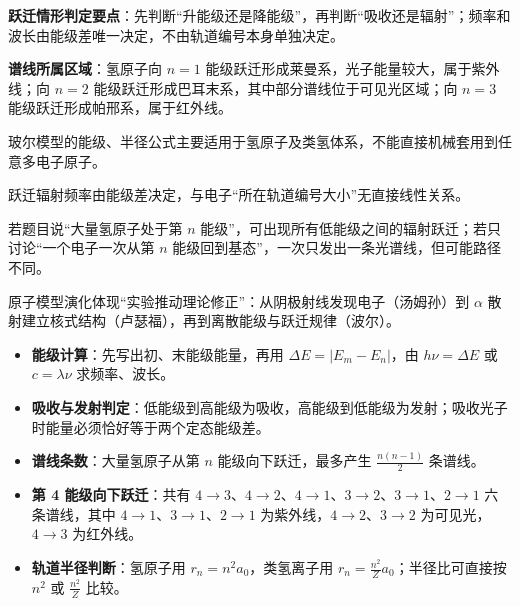 \textbf{跃迁情形判定要点}：先判断“升能级还是降能级”，再判断“吸收还是辐射”；频率和波长由能级差唯一决定，不由轨道编号本身单独决定。

\textbf{谱线所属区域}：氢原子向 $n=1$ 能级跃迁形成莱曼系，光子能量较大，属于紫外线；向 $n=2$ 能级跃迁形成巴耳末系，其中部分谱线位于可见光区域；向 $n=3$ 能级跃迁形成帕邢系，属于红外线。

\begin{formulanotebox}
玻尔模型的能级、半径公式主要适用于氢原子及类氢体系，不能直接机械套用到任意多电子原子。

跃迁辐射频率由能级差决定，与电子“所在轨道编号大小”无直接线性关系。

若题目说“大量氢原子处于第 $n$ 能级”，可出现所有低能级之间的辐射跃迁；若只讨论“一个电子一次从第 $n$ 能级回到基态”，一次只发出一条光谱线，但可能路径不同。
\end{formulanotebox}

\begin{keypointbox}
原子模型演化体现“实验推动理论修正”：从阴极射线发现电子（汤姆孙）到 $\alpha$ 散射建立核式结构（卢瑟福），再到离散能级与跃迁规律（波尔）。
\end{keypointbox}

\begin{casetypebox}[title={\strut\textcolor{white}{\bfseries 常见题型：波尔模型与能级跃迁}}]
\begin{itemize}[leftmargin=1.5em]
  \item \textbf{能级计算}：先写出初、末能级能量，再用 $\Delta E=|E_m-E_n|$，由 $h\nu=\Delta E$ 或 $c=\lambda\nu$ 求频率、波长。
  \item \textbf{吸收与发射判定}：低能级到高能级为吸收，高能级到低能级为发射；吸收光子时能量必须恰好等于两个定态能级差。
  \item \textbf{谱线条数}：大量氢原子从第 $n$ 能级向下跃迁，最多产生 $\frac{n(n-1)}{2}$ 条谱线。
  \item \textbf{第 4 能级向下跃迁}：共有 $4\to3$、$4\to2$、$4\to1$、$3\to2$、$3\to1$、$2\to1$ 六条谱线，其中 $4\to1$、$3\to1$、$2\to1$ 为紫外线，$4\to2$、$3\to2$ 为可见光，$4\to3$ 为红外线。
  \item \textbf{轨道半径判断}：氢原子用 $r_n=n^2a_0$，类氢离子用 $r_n=\frac{n^2}{Z}a_0$；半径比可直接按 $n^2$ 或 $\frac{n^2}{Z}$ 比较。
\end{itemize}
\end{casetypebox}